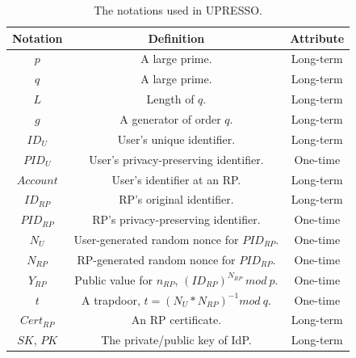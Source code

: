 \begin{table}[tb]
    \caption{The notations used in UPRESSO.}
    \centering
    \begin{tabular}{|c|c|c|}
    \hline
    {Notation} & {Definition} & {Attribute} \\
    \hline
    {$p$} & {A large prime.} & {Long-term} \\
    \hline
    {$q$} & {A large prime.} & {Long-term} \\
    \hline
    {$L$} & {Length of $q$. } & {Long-term} \\
    \hline
    {$g$} & {A generator of order $q$. } & {Long-term} \\
    \hline
    {$ID_U$} & {User's unique identifier.} & {Long-term} \\
    \hline
    {$PID_U$} & {User's privacy-preserving identifier.} & {One-time}\\
    \hline
    {$Account$} & {User's identifier at an RP.} & {Long-term} \\
    \hline
    {$ID_{RP}$} & {RP's original identifier.} & {Long-term} \\
    \hline
    {$PID_{RP}$} & {RP's privacy-preserving identifier.} & {One-time} \\
    \hline
    {$N_U$} & {User-generated random nonce for $PID_{RP}$.} & {One-time} \\
    \hline
    {$N_{RP}$} & {RP-generated random nonce for $PID_{RP}$.} & {One-time} \\
    \hline
    {$Y_{RP}$} & {Public value for $n_{RP}$, $(ID_{RP})^{N_{RP}} \ mod\ p$.} & {One-time} \\
    \hline
    {$t$} & {A trapdoor, $t=(N_U*N_{RP})^{-1} mod \ q$.} & {One-time} \\
    \hline
    {$Cert_{RP}$} & {An RP certificate. } & {Long-term} \\
    \hline
    {$SK$, $PK$} & {The private/public key of IdP. } & {Long-term} \\
     \hline
    \end{tabular}
    \label{tbl:notations}
\end{table}


